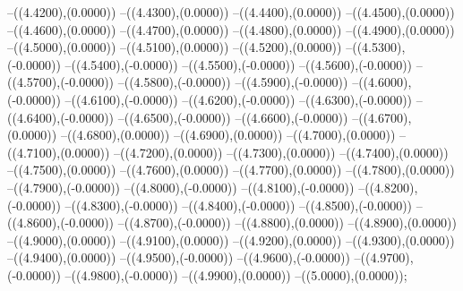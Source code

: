 {	--({\sx*(4.4200)},{\sy*(0.0000)})
	--({\sx*(4.4300)},{\sy*(0.0000)})
	--({\sx*(4.4400)},{\sy*(0.0000)})
	--({\sx*(4.4500)},{\sy*(0.0000)})
	--({\sx*(4.4600)},{\sy*(0.0000)})
	--({\sx*(4.4700)},{\sy*(0.0000)})
	--({\sx*(4.4800)},{\sy*(0.0000)})
	--({\sx*(4.4900)},{\sy*(0.0000)})
	--({\sx*(4.5000)},{\sy*(0.0000)})
	--({\sx*(4.5100)},{\sy*(0.0000)})
	--({\sx*(4.5200)},{\sy*(0.0000)})
	--({\sx*(4.5300)},{\sy*(-0.0000)})
	--({\sx*(4.5400)},{\sy*(-0.0000)})
	--({\sx*(4.5500)},{\sy*(-0.0000)})
	--({\sx*(4.5600)},{\sy*(-0.0000)})
	--({\sx*(4.5700)},{\sy*(-0.0000)})
	--({\sx*(4.5800)},{\sy*(-0.0000)})
	--({\sx*(4.5900)},{\sy*(-0.0000)})
	--({\sx*(4.6000)},{\sy*(-0.0000)})
	--({\sx*(4.6100)},{\sy*(-0.0000)})
	--({\sx*(4.6200)},{\sy*(-0.0000)})
	--({\sx*(4.6300)},{\sy*(-0.0000)})
	--({\sx*(4.6400)},{\sy*(-0.0000)})
	--({\sx*(4.6500)},{\sy*(-0.0000)})
	--({\sx*(4.6600)},{\sy*(-0.0000)})
	--({\sx*(4.6700)},{\sy*(0.0000)})
	--({\sx*(4.6800)},{\sy*(0.0000)})
	--({\sx*(4.6900)},{\sy*(0.0000)})
	--({\sx*(4.7000)},{\sy*(0.0000)})
	--({\sx*(4.7100)},{\sy*(0.0000)})
	--({\sx*(4.7200)},{\sy*(0.0000)})
	--({\sx*(4.7300)},{\sy*(0.0000)})
	--({\sx*(4.7400)},{\sy*(0.0000)})
	--({\sx*(4.7500)},{\sy*(0.0000)})
	--({\sx*(4.7600)},{\sy*(0.0000)})
	--({\sx*(4.7700)},{\sy*(0.0000)})
	--({\sx*(4.7800)},{\sy*(0.0000)})
	--({\sx*(4.7900)},{\sy*(-0.0000)})
	--({\sx*(4.8000)},{\sy*(-0.0000)})
	--({\sx*(4.8100)},{\sy*(-0.0000)})
	--({\sx*(4.8200)},{\sy*(-0.0000)})
	--({\sx*(4.8300)},{\sy*(-0.0000)})
	--({\sx*(4.8400)},{\sy*(-0.0000)})
	--({\sx*(4.8500)},{\sy*(-0.0000)})
	--({\sx*(4.8600)},{\sy*(-0.0000)})
	--({\sx*(4.8700)},{\sy*(-0.0000)})
	--({\sx*(4.8800)},{\sy*(0.0000)})
	--({\sx*(4.8900)},{\sy*(0.0000)})
	--({\sx*(4.9000)},{\sy*(0.0000)})
	--({\sx*(4.9100)},{\sy*(0.0000)})
	--({\sx*(4.9200)},{\sy*(0.0000)})
	--({\sx*(4.9300)},{\sy*(0.0000)})
	--({\sx*(4.9400)},{\sy*(0.0000)})
	--({\sx*(4.9500)},{\sy*(-0.0000)})
	--({\sx*(4.9600)},{\sy*(-0.0000)})
	--({\sx*(4.9700)},{\sy*(-0.0000)})
	--({\sx*(4.9800)},{\sy*(-0.0000)})
	--({\sx*(4.9900)},{\sy*(0.0000)})
	--({\sx*(5.0000)},{\sy*(0.0000)});
}
